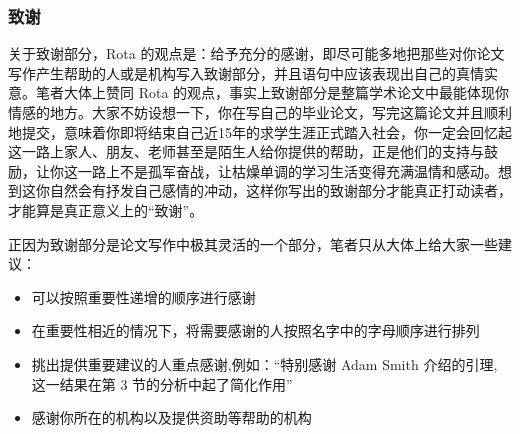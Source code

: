 \documentclass{formatBook}
\begin{document}
\subsubsection{致谢}
关于致谢部分，Rota 的观点是：给予充分的感谢，即尽可能多地把那些对你论文写作产生帮助的人或是机构写入致谢部分，并且语句中应该表现出自己的真情实意\cite{rota_ten_1997}。笔者大体上赞同 Rota 的观点，事实上致谢部分是整篇学术论文中最能体现你情感的地方。大家不妨设想一下，你在写自己的毕业论文，写完这篇论文并且顺利地提交，意味着你即将结束自己近15年的求学生涯正式踏入社会，你一定会回忆起这一路上家人、朋友、老师甚至是陌生人给你提供的帮助，正是他们的支持与鼓励，让你这一路上不是孤军奋战，让枯燥单调的学习生活变得充满温情和感动。想到这你自然会有抒发自己感情的冲动，这样你写出的致谢部分才能真正打动读者，才能算是真正意义上的“致谢”。
\par 正因为致谢部分是论文写作中极其灵活的一个部分，笔者只从大体上给大家一些建议：
\begin{itemize}
    \item 可以按照重要性递增的顺序进行感谢
    \item 在重要性相近的情况下，将需要感谢的人按照名字中的字母顺序进行排列
    \item 挑出提供重要建议的人重点感谢,例如：“特别感谢 Adam Smith 介绍的引理, 这一结果在第 3 节的分析中起了简化作用”
    \item 感谢你所在的机构以及提供资助等帮助的机构
\end{itemize}
\end{document}
